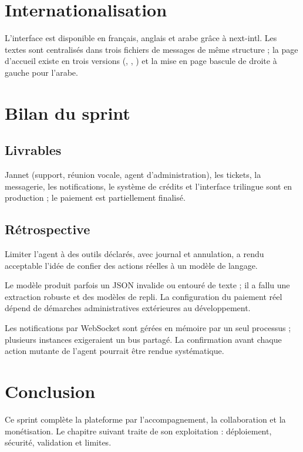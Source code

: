 
\section{Internationalisation}
L'interface est disponible en français, anglais et arabe grâce à next-intl. Les textes sont centralisés dans trois fichiers de messages de même structure ; la page d'accueil existe en trois versions (\route{/}, , ) et la mise en page bascule de droite à gauche pour l'arabe. 

\section{Bilan du sprint}
\subsection{Livrables}
Jannet (support, réunion vocale, agent d'administration), les tickets, la messagerie, les notifications, le système de crédits et l'interface trilingue sont en production ; le paiement est partiellement finalisé.

\subsection{Rétrospective}
\begin{description}[leftmargin=1.2em,style=nextline]
  \item[Ce qui a bien fonctionné.] Limiter l'agent à des outils déclarés, avec journal et annulation, a rendu acceptable l'idée de confier des actions réelles à un modèle de langage.
  \item[Ce qui a posé problème.] Le modèle produit parfois un JSON invalide ou entouré de texte ; il a fallu une extraction robuste et des modèles de repli. La configuration du paiement réel dépend de démarches administratives extérieures au développement.
  \item[À améliorer.] Les notifications par WebSocket sont gérées en mémoire par un seul processus ; plusieurs instances exigeraient un bus partagé. La confirmation avant chaque action mutante de l'agent pourrait être rendue systématique.
\end{description}

\section{Conclusion}
Ce sprint complète la plateforme par l'accompagnement, la collaboration et la monétisation. Le chapitre suivant traite de son exploitation : déploiement, sécurité, validation et limites.
